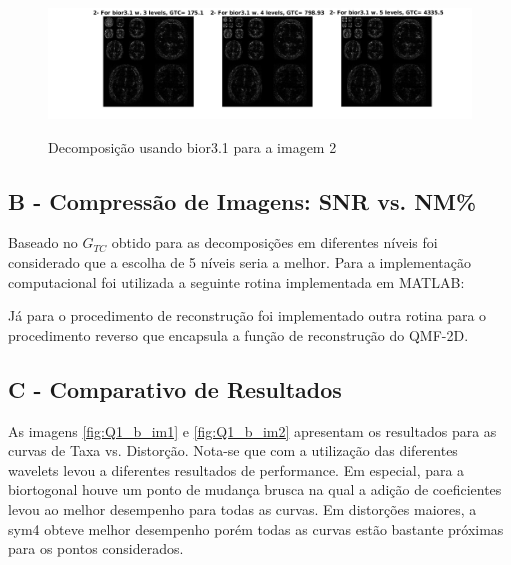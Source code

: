 \documentclass{article}
\begin{document}
\begin{figure}[H]
	\begin{center}
		\label{fig:2_bior3.1}
		\includegraphics[scale=0.55]{../2_bior31.png}
		\caption{Decomposição usando bior3.1 para a imagem 2}
	\end{center}
\end{figure}  

\subsection*{B - Compressão de Imagens: SNR vs. NM\%}
Baseado no $G_{TC}$ obtido para as decomposições em diferentes níveis foi considerado que a escolha de 5 níveis seria a melhor. Para a implementação computacional foi utilizada a seguinte rotina implementada em MATLAB:



Já para o procedimento de reconstrução foi implementado outra rotina para o procedimento reverso que encapsula a função de reconstrução do QMF-2D.



\subsection*{C - Comparativo de Resultados}
As imagens \ref{fig:Q1_b_im1} e \ref{fig:Q1_b_im2} apresentam os resultados para as curvas de Taxa vs. Distorção. Nota-se que com a utilização das diferentes wavelets levou a diferentes resultados de performance. Em especial, para a biortogonal houve um ponto de mudança brusca na qual a adição de coeficientes levou ao melhor desempenho para todas as curvas. Em distorções maiores, a sym4 obteve melhor desempenho porém todas as curvas estão bastante próximas para os pontos considerados. 
\end{document}
